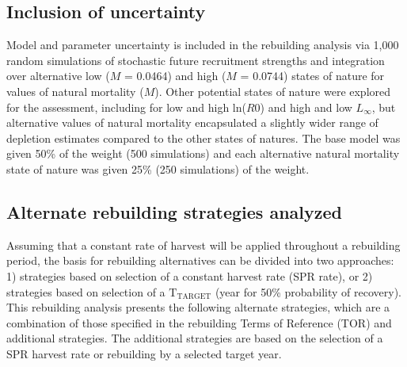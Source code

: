 \documentclass[11pt,
  english,
  a4paper,
]{article}
\begin{document}
\leavevmode\tagmcend\tagstructend\par


\hypertarget{inclusion-of-uncertainty}{%
\subsection{Inclusion of uncertainty}\label{inclusion-of-uncertainty}}

\leavevmode\tagmcend\tagstructend


Model and parameter uncertainty is included in the rebuilding analysis via 1,000 random simulations of stochastic future recruitment strengths and integration over alternative low ({\(M\)\leavevmode\tagmcend\tagstructend} = 0.0464) and high ({\(M\)\leavevmode\tagmcend\tagstructend} = 0.0744) states of nature for values of natural mortality ({\(M\)\leavevmode\tagmcend\tagstructend}). Other potential states of nature were explored for the assessment, including for low and high ln({\(R0\)\leavevmode\tagmcend\tagstructend}) and high and low {\(L_{\infty}\)\leavevmode\tagmcend\tagstructend}, but alternative values of natural mortality encapsulated a slightly wider range of depletion estimates compared to the other states of natures. The base model was given 50\% of the weight (500 simulations) and each alternative natural mortality state of nature was given 25\% (250 simulations) of the weight.

\leavevmode\tagmcend\tagstructend\par


\hypertarget{alternate-rebuilding-strategies-analyzed}{%
\subsection{Alternate rebuilding strategies analyzed}\label{alternate-rebuilding-strategies-analyzed}}

\leavevmode\tagmcend\tagstructend


Assuming that a constant rate of harvest will be applied throughout a rebuilding period, the basis for rebuilding alternatives can be divided into two approaches: 1) strategies based on selection of a constant harvest rate (SPR rate), or 2) strategies based on selection of a {\(\text{T}_\text{TARGET}\)\leavevmode\tagmcend\tagstructend} (year for 50\% probability of recovery). This rebuilding analysis presents the following alternate strategies, which are a combination of those specified in the rebuilding Terms of Reference (TOR) and additional strategies. The additional strategies are based on the selection of a SPR harvest rate or rebuilding by a selected target year.
\end{document}
